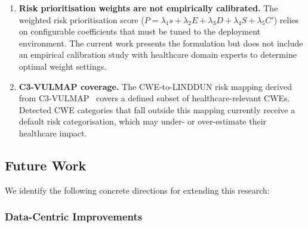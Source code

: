 \begin{enumerate}
    \item \textbf{Risk prioritisation weights are not empirically
          calibrated.}
          The weighted risk prioritisation score
          ($P = \lambda_1 s + \lambda_2 E + \lambda_3 D + \lambda_4 S
          + \lambda_5 C'$) relies on configurable coefficients that must
          be tuned to the deployment environment.  The current work
          presents the formulation but does not include an empirical
          calibration study with healthcare domain experts to determine
          optimal weight settings.

    \item \textbf{C3-VULMAP coverage.}
          The CWE-to-LINDDUN risk mapping derived from
          C3-VULMAP~\cite{santos2023c3vulmap} covers a defined subset of
          healthcare-relevant CWEs.  Detected CWE categories that fall
          outside this mapping currently receive a default risk
          categorisation, which may under- or over-estimate their
          healthcare impact.
\end{enumerate}

\subsection{Future Work}
\label{sec:future_work}

We identify the following concrete directions for extending this research:

\subsubsection{Data-Centric Improvements}

